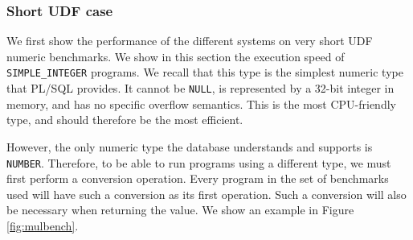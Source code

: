 \documentclass[twoside,11pt,a4paper]{article}
\newcommand{\pls}[1]{\small\texttt{#1}\normalsize}
\newcommand{\plstype}[1]{\pls{#1}}
\newcommand{\oranum}{\plstype{NUMBER}}
\newcommand{\simpleint}{\plstype{SIMPLE\_INTEGER}}
\newcommand{\plsnull}{\pls{NULL}}
\newcommand{\benchsystem}[1]{\textsf{#1}}
\newcommand{\ncpg}{\benchsystem{pragma}}
\begin{document}

\subsubsection{Short UDF case}

We first show the performance of the different systems on very short UDF numeric benchmarks. We show in this section the execution speed of \simpleint{} programs. We recall that this type is the simplest numeric type that PL/SQL provides. It cannot be \plsnull{}, is represented by a 32-bit integer in memory, and has no specific overflow semantics. This is the most CPU-friendly type, and should therefore be the most efficient.

However, the only numeric type the database understands and supports is \oranum{}. Therefore, to be able to run programs using a different type, we must first perform a conversion operation. Every program in the set of benchmarks used will have such a conversion as its first operation. Such a conversion will also be necessary when returning the value. We show an example in Figure \ref{fig:mulbench}.
\end{document}
